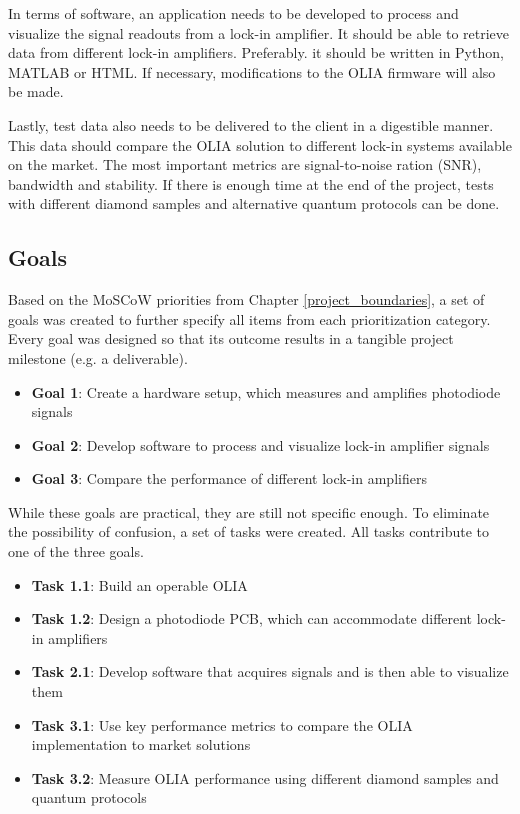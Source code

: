 \documentclass{report}
\begin{document}
	In terms of software, an application needs to be developed to process and visualize the signal readouts from a lock-in amplifier. It should be able to retrieve data from different lock-in amplifiers. Preferably. it should be written in Python, MATLAB or HTML. If necessary, modifications to the OLIA firmware will also be made. 
	
	Lastly, test data also needs to be delivered to the client in a digestible manner. This data should compare the OLIA solution to different lock-in systems available on the market. The most important metrics are signal-to-noise ration (SNR), bandwidth and stability. If there is enough time at the end of the project, tests with different diamond samples and alternative quantum protocols can be done.
	
	\subsection{Goals} \label{chap:goals}
	Based on the MoSCoW priorities from Chapter \ref{project_boundaries}, a set of goals was created to further specify all items from each prioritization category. Every goal was designed so that its outcome results in a tangible project milestone (e.g. a deliverable).
	
	\begin{itemize}
		\item \textbf{Goal 1}: Create a hardware setup, which measures and amplifies photodiode signals
		\item \textbf{Goal 2}: Develop software to process and visualize lock-in amplifier signals
		\item \textbf{Goal 3}: Compare the performance of different lock-in amplifiers
	\end{itemize}
	
	While these goals are practical, they are still not specific enough. To eliminate the possibility of confusion, a set of tasks were created. All tasks contribute to one of the three goals.
	
	\begin{itemize}
		\item \textbf{Task 1.1}: Build an operable OLIA
		\item \textbf{Task 1.2}: Design a photodiode PCB, which can accommodate different lock-in amplifiers
		\item \textbf{Task 2.1}: Develop software that acquires signals and is then able to visualize them
		\item \textbf{Task 3.1}: Use key performance metrics to compare the OLIA implementation to market solutions
		\item \textbf{Task 3.2}: Measure OLIA performance using different diamond samples and quantum protocols
	\end{itemize}
	
\end{document}
